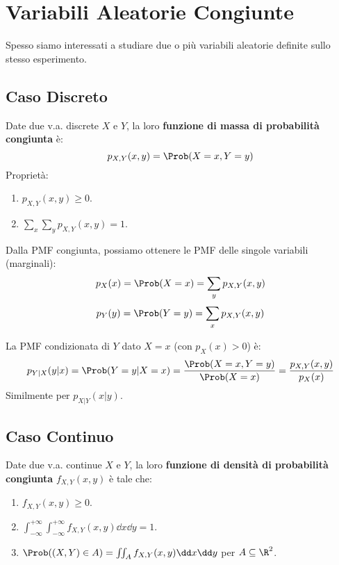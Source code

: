 \chapter{Variabili Aleatorie Congiunte}
\label{cap:va_congiunte}
Spesso siamo interessati a studiare due o più variabili aleatorie definite sullo stesso esperimento.

\section{Caso Discreto}
\begin{definition}
Date due v.a. discrete $X$ e $Y$, la loro \textbf{funzione di massa di probabilità congiunta} è:
\[ p_{X,Y}(x,y) = \Prob(X=x, Y=y) \]
Proprietà:
\begin{enumerate}
    \item $p_{X,Y}(x,y) \ge 0$.
    \item $\sum_x \sum_y p_{X,Y}(x,y) = 1$.
\end{enumerate}
\end{definition}

\begin{definition}
Dalla PMF congiunta, possiamo ottenere le PMF delle singole variabili (marginali):
\[ p_X(x) = \Prob(X=x) = \sum_y p_{X,Y}(x,y) \]
\[ p_Y(y) = \Prob(Y=y) = \sum_x p_{X,Y}(x,y) \]
\end{definition}

\begin{definition}
La PMF condizionata di $Y$ dato $X=x$ (con $p_X(x)>0$) è:
\[ p_{Y|X}(y|x) = \Prob(Y=y|X=x) = \frac{\Prob(X=x, Y=y)}{\Prob(X=x)} = \frac{p_{X,Y}(x,y)}{p_X(x)} \]
Similmente per $p_{X|Y}(x|y)$.
\end{definition}

\section{Caso Continuo}
\begin{definition}
Date due v.a. continue $X$ e $Y$, la loro \textbf{funzione di densità di probabilità congiunta} $f_{X,Y}(x,y)$ è tale che:
\begin{enumerate}
    \item $f_{X,Y}(x,y) \ge 0$.
    \item $\int_{-\infty}^{+\infty} \int_{-\infty}^{+\infty} f_{X,Y}(x,y) \dd x \dd y = 1$.
    \item $\Prob((X,Y) \in A) = \iint_A f_{X,Y}(x,y) \dd x \dd y$ per $A \subseteq \R^2$.
\end{enumerate}
\end{definition}

